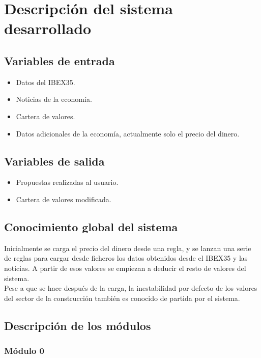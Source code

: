 \newpage
\section{Descripción del sistema desarrollado}

\subsection{Variables de entrada}

\begin{itemize}
\item Datos del IBEX35.
\item Noticias de la economía.
\item Cartera de valores.
\item Datos adicionales de la economía, actualmente solo el precio del dinero.
\end{itemize}

\subsection{Variables de salida}

\begin{itemize}
\item Propuestas realizadas al usuario.
\item Cartera de valores modificada.
\end{itemize}

\subsection{Conocimiento global del sistema}

Inicialmente se carga el precio del dinero desde una regla, y se lanzan una serie de reglas para cargar desde ficheros los datos obtenidos desde el IBEX35 y las noticias. A partir de esos valores se empiezan a deducir el resto de valores del sistema.\\

Pese a que se hace después de la carga, la inestabilidad por defecto de los valores del sector de la construcción también es conocido de partida por el sistema.\\

\subsection{Descripción de los módulos}

\subsubsection{Módulo 0}

